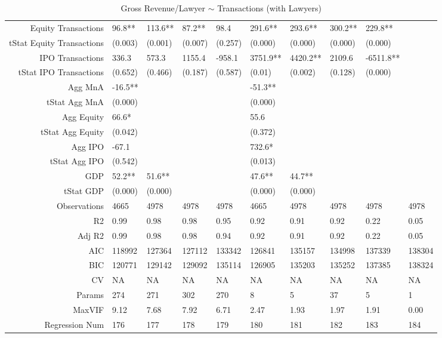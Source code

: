 \begin{table}[ht]
\begin{tabular}{rlllllllll}
  Equity Transactions & 96.8** & 113.6** & 87.2** & 98.4 & 291.6** & 293.6** & 300.2** & 229.8** &  \\ 
  tStat Equity Transactions & (0.003) & (0.001) & (0.007) & (0.257) & (0.000) & (0.000) & (0.000) & (0.000) &  \\ 
  IPO Transactions & 336.3 & 573.3 & 1155.4 & -958.1 & 3751.9** & 4420.2** & 2109.6 & -6511.8** &  \\ 
  tStat IPO Transactions & (0.652) & (0.466) & (0.187) & (0.587) & (0.01) & (0.002) & (0.128) & (0.000) &  \\ 
  Agg MnA & -16.5** &  &  &  & -51.3** &  &  &  &  \\ 
  tStat Agg MnA & (0.000) &  &  &  & (0.000) &  &  &  &  \\ 
  Agg Equity & 66.6* &  &  &  & 55.6 &  &  &  &  \\ 
  tStat Agg Equity & (0.042) &  &  &  & (0.372) &  &  &  &  \\ 
  Agg IPO & -67.1 &  &  &  & 732.6* &  &  &  &  \\ 
  tStat Agg IPO & (0.542) &  &  &  & (0.013) &  &  &  &  \\ 
  GDP & 52.2** & 51.6** &  &  & 47.6** & 44.7** &  &  &  \\ 
  tStat GDP & (0.000) & (0.000) &  &  & (0.000) & (0.000) &  &  &  \\ 
  Observations & 4665 & 4978 & 4978 & 4978 & 4665 & 4978 & 4978 & 4978 & 4978 \\ 
  R2 & 0.99 & 0.98 & 0.98 & 0.95 & 0.92 & 0.91 & 0.92 & 0.22 & 0.05 \\ 
  Adj R2 & 0.99 & 0.98 & 0.98 & 0.94 & 0.92 & 0.91 & 0.92 & 0.22 & 0.05 \\ 
  AIC & 118992 & 127364 & 127112 & 133342 & 126841 & 135157 & 134998 & 137339 & 138304 \\ 
  BIC & 120771 & 129142 & 129092 & 135114 & 126905 & 135203 & 135252 & 137385 & 138324 \\ 
  CV & NA & NA & NA & NA & NA & NA & NA & NA & NA \\ 
  Params & 274 & 271 & 302 & 270 & 8 & 5 & 37 & 5 & 1 \\ 
  MaxVIF & 9.12 & 7.68 & 7.92 & 6.71 & 2.47 & 1.93 & 1.97 & 1.91 & 0.00 \\ 
  Regression Num & 176 & 177 & 178 & 179 & 180 & 181 & 182 & 183 & 184 \\ 
   \hline
\end{tabular}
\caption{Gross Revenue/Lawyer $\sim$ Transactions (with Lawyers)} 
\end{table}
